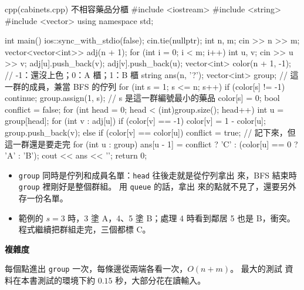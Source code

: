 \begin{example}[label=ex:cabinets]{cpp}{(cabinets.cpp) 不相容藥品分櫃}
#include <iostream>
#include <string>
#include <vector>
using namespace std;

int main() {
    ios::sync_with_stdio(false);
    cin.tie(nullptr);
    int n, m;
    cin >> n >> m;
    vector<vector<int>> adj(n + 1);
    for (int i = 0; i < m; i++) {
        int u, v;
        cin >> u >> v;
        adj[u].push_back(v);
        adj[v].push_back(u);
    }
    vector<int> color(n + 1, -1);          // -1：還沒上色；0：A 櫃；1：B 櫃
    string ans(n, '?');
    vector<int> group;                     // 這一群的成員，兼當 BFS 的佇列
    for (int s = 1; s <= n; s++) {
        if (color[s] != -1) {
            continue;
        }
        group.assign(1, s);                // s 是這一群編號最小的藥品
        color[s] = 0;
        bool conflict = false;
        for (int head = 0; head < (int)group.size(); head++) {
            int u = group[head];
            for (int v : adj[u]) {
                if (color[v] == -1) {
                    color[v] = 1 - color[u];
                    group.push_back(v);
                } else if (color[v] == color[u]) {
                    conflict = true;       // 記下來，但這一群還是要走完
                }
            }
        }
        for (int u : group) {
            ans[u - 1] = conflict ? 'C' : (color[u] == 0 ? 'A' : 'B');
        }
    }
    cout << ans << '\n';
    return 0;
}
\end{example}


\begin{itemize}
\item \texttt{group} 同時是佇列和成員名單：\texttt{head} 往後走就是從佇列拿出
來，BFS 結束時 \texttt{group} 裡剛好是整個群組。 用 \texttt{queue} 的話，拿出
來的點就不見了，還要另外存一份名單。
\item 範例的 $s = 3$ 時，3 塗 A，4、5 塗 B；處理 4 時看到鄰居 5 也是 B，衝突。
程式繼續把群組走完，三個都標 C。
\end{itemize}

\textbf{複雜度}

每個點進出 \texttt{group} 一次，每條邊從兩端各看一次，$O(n + m)$。 最大的測試
資料在本書測試的環境下約 $0.15$ 秒，大部分花在讀輸入。

